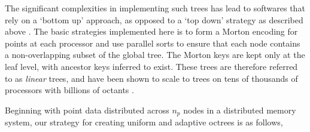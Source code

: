 The significant complexities in implementing such trees has lead to softwares that rely on a `bottom up' approach, as opposed to a `top down' strategy as described above \cite{sampath2008dendro,BursteddeWilcoxGhattas11}. The basic strategies implemented here is to form a Morton encoding for points at each processor and use parallel sorts to ensure that each node contains a non-overlapping subset of the global tree. The Morton keys are kept only at the leaf level, with ancestor keys inferred to exist. These trees are therefore referred to as \textit{linear} trees, and have been shown to scale to trees on tens of thousands of processors with billions of octants \cite{BursteddeWilcoxGhattas11}.

Beginning with point data distributed across $n_p$ nodes in a distributed memory system, our strategy for creating uniform and adaptive octrees is as follows,

